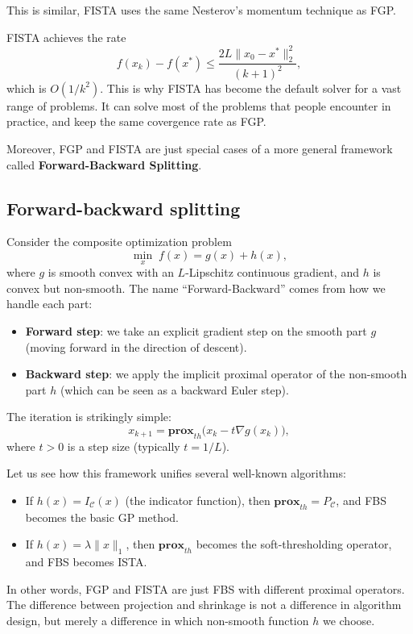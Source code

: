 \documentclass[lang=en,color=blue,mode=fancy,titlestyle=hang]{elegantbook}
\begin{document}
This is similar, FISTA uses the same Nesterov's momentum technique as FGP.

FISTA achieves the rate
\[
f(x_k) - f(x^*) \le \frac{2L \|x_0 - x^*\|_2^2}{(k+1)^2},
\]
which is $O(1/k^2)$. This is why FISTA has become the default solver for a vast range of problems.
It can solve most of the problems that people encounter in practice, and keep the same covergence
rate as FGP.

Moreover, FGP and FISTA are just special cases of a more general framework called
\textbf{Forward-Backward Splitting}.

\subsection{Forward-backward splitting}

Consider the composite optimization problem
\[
\min_{x} \; f(x) = g(x) + h(x),
\]
where $g$ is smooth convex with an $L$-Lipschitz continuous gradient, and $h$ is convex but
non-smooth. The name ``Forward-Backward'' comes from how we handle each part:
\begin{itemize}
  \item \textbf{Forward step}: we take an explicit gradient step on the smooth part $g$
  (moving forward in the direction of descent).
  \item \textbf{Backward step}: we apply the implicit proximal operator of the non-smooth part $h$
  (which can be seen as a backward Euler step).
\end{itemize}

The iteration is strikingly simple:
\[
x_{k+1} = \mathbf{prox}_{t h}\bigl( x_k - t \nabla g(x_k) \bigr),
\]
where $t > 0$ is a step size (typically $t = 1/L$). 

Let us see how this framework unifies several well-known algorithms:
\begin{itemize}
  \item If $h(x) = I_{\mathcal{C}}(x)$ (the indicator function), then
  $\mathbf{prox}_{t h} = P_{\mathcal{C}}$, and FBS becomes the basic GP method.
  \item If $h(x) = \lambda \|x\|_1$, then $\mathbf{prox}_{t h}$ becomes the soft-thresholding
  operator, and FBS becomes ISTA.
\end{itemize}

In other words, FGP and FISTA are just FBS with different proximal operators. The difference
between projection and shrinkage is not a difference in algorithm design, but merely a
difference in which non-smooth function $h$ we choose.
\end{document}
